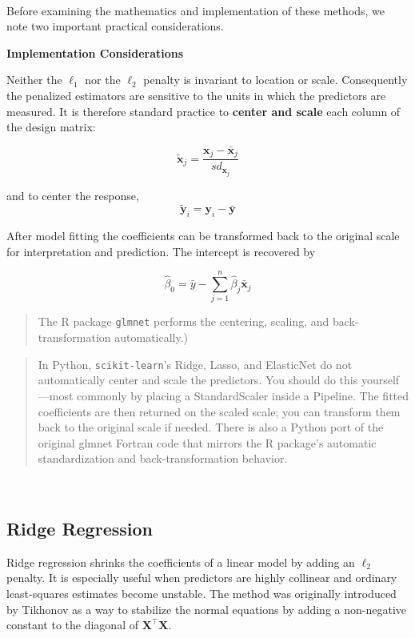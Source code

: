 \documentclass[
]{book}
\begin{document}
~

Before examining the mathematics and implementation of these methods, we note two important practical considerations.

\textbf{Implementation Considerations}

Neither the \(\ell_1\) nor the \(\ell_2\) penalty is invariant to location or scale. Consequently the penalized estimators are sensitive to the units in which the predictors are measured. It is therefore standard practice to \textbf{center and scale} each column of the design matrix:

\[\tilde{\mathbf{x}}_{j} = \frac{ \mathbf{x}_{j} - \bar{\mathbf{x}}_{j} } { sd_{\mathbf{x}_{j}}} \]

and to center the response,
\[\mathbf{\tilde{y}}_i = \mathbf{y}_{i} - \bar{\mathbf{y}}\]

After model fitting the coefficients can be transformed back to the original scale for interpretation and prediction. The intercept is recovered by

\[\hat{\beta}_0 = \bar{y} - \sum_{j=1}^{n} \hat{\beta}_j \bar{\mathbf{x}}_{j} \]

\begin{quote}
The R package \texttt{glmnet} performs the centering, scaling, and back-transformation automatically.)
\end{quote}

\begin{quote}
In Python, \texttt{scikit-learn}'s Ridge, Lasso, and ElasticNet do not automatically center and scale the predictors. You should do this yourself---most commonly by placing a StandardScaler inside a Pipeline. The fitted coefficients are then returned on the scaled scale; you can transform them back to the original scale if needed. There is also a Python port of the original glmnet Fortran code that mirrors the R package's automatic standardization and back-transformation behavior.
\end{quote}

~

\subsection{Ridge Regression}\label{ridge-regression}

Ridge regression shrinks the coefficients of a linear model by adding an \(\ell_2\) penalty. It is especially useful when predictors are highly collinear and ordinary least-squares estimates become unstable. The method was originally introduced by Tikhonov as a way to stabilize the normal equations by adding a non-negative constant to the diagonal of \(\mathbf{X}^\top\mathbf{X}\).
\end{document}
